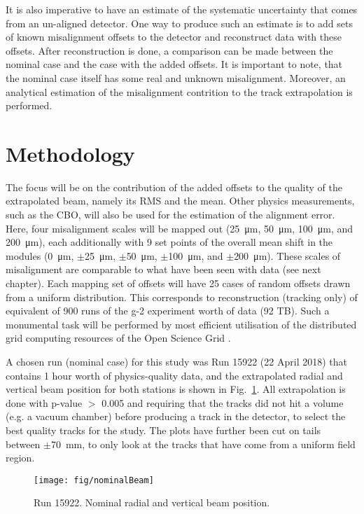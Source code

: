 \documentclass[a4paper,11pt]{article}
\begin{document}
It is also imperative to have an estimate of the systematic uncertainty that comes from an un-aligned detector. One way to produce such an estimate is to add sets of known misalignment offsets to the detector and reconstruct data with these offsets. After reconstruction is done, a comparison can be made between the nominal case and the case with the added offsets. It is important to note, that the nominal case itself has some real and unknown misalignment. Moreover, an analytical estimation of the misalignment contrition to the track extrapolation is performed. 


\section{Methodology}  

The focus will be on the contribution of the added offsets to the quality of the extrapolated beam, namely its RMS and the mean. Other physics measurements, such as the CBO, will also be used for the estimation of the alignment error. Here, four misalignment scales will be mapped out (\SI{25}{\micro\metre}, \SI{50}{\micro\metre}, \SI{100}{\micro\metre}, and \SI{200}{\micro\metre}), each additionally with 9 set points of the overall mean shift in the modules (\SI{0}{\micro\metre}, $\pm$\SI{25}{\micro\metre},  $\pm$\SI{50}{\micro\metre},  $\pm$\SI{100}{\micro\metre}, and $\pm$\SI{200}{\micro\metre}). These scales of misalignment are comparable to what have been seen with data (see next chapter). Each mapping set of offsets will have 25 cases of random offsets drawn from a uniform distribution. This corresponds to reconstruction (tracking only) of equivalent of 900 runs of the g-2 experiment worth of data (92 TB). Such a monumental task will be performed by most efficient utilisation of the distributed grid computing resources of the Open Science Grid \cite{OSG}.

A chosen run (nominal case) for this study was Run 15922 (22 April 2018) that contains 1 hour worth of physics-quality data, and the extrapolated radial and vertical beam position for both stations is shown in Fig.~\ref{fig:nominalBeam}. All extrapolation is done with p-value $>$ 0.005 and requiring that the tracks did not hit a volume (e.g. a vacuum chamber) before producing a track in the detector, to select the best quality tracks for the study. The plots have further been cut on tails between $\pm$\SI{70}{\milli\metre}, to only look at the tracks that have come from a uniform field region.


\begin{figure}[ht!]
    \centering
    \texttt{[image: fig/nominalBeam]}
    \vspace{-8pt}
    \caption{Run 15922. Nominal radial and vertical beam position.}
    \label{fig:nominalBeam}
\end{figure}





\clearpage


\nocite{*}
\thispagestyle{plain}

\end{document}
